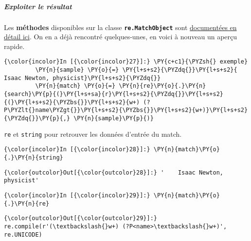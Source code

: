     \hypertarget{exploiter-le-ruxe9sultat}{%
\subparagraph{Exploiter le résultat}\label{exploiter-le-ruxe9sultat}}

    Les \textbf{méthodes} disponibles sur la classe
\textbf{\texttt{re.MatchObject}} sont
\href{https://docs.python.org/3/library/re.html\#match-objects}{documentées
en détail ici}. On en a déjà rencontré quelques-unes, en voici à nouveau
un aperçu rapide.

    \begin{Verbatim}[commandchars=\\\{\},frame=single,framerule=0.3mm,rulecolor=\color{cellframecolor}]
{\color{incolor}In [{\color{incolor}27}]:} \PY{c+c1}{\PYZsh{} exemple}
         \PY{n}{sample} \PY{o}{=} \PY{l+s+s2}{\PYZdq{}}\PY{l+s+s2}{    Isaac Newton, physicist}\PY{l+s+s2}{\PYZdq{}}
         \PY{n}{match} \PY{o}{=} \PY{n}{re}\PY{o}{.}\PY{n}{search}\PY{p}{(}\PY{l+s+sa}{r}\PY{l+s+s2}{\PYZdq{}}\PY{l+s+s2}{(}\PY{l+s+s2}{\PYZbs{}}\PY{l+s+s2}{w+) (?P\PYZlt{}name\PYZgt{}}\PY{l+s+s2}{\PYZbs{}}\PY{l+s+s2}{w+)}\PY{l+s+s2}{\PYZdq{}}\PY{p}{,} \PY{n}{sample}\PY{p}{)}
\end{Verbatim}


    \texttt{re} et \texttt{string} pour retrouver les données d'entrée du
match.

    \begin{Verbatim}[commandchars=\\\{\},frame=single,framerule=0.3mm,rulecolor=\color{cellframecolor}]
{\color{incolor}In [{\color{incolor}28}]:} \PY{n}{match}\PY{o}{.}\PY{n}{string}
\end{Verbatim}


\begin{Verbatim}[commandchars=\\\{\},frame=single,framerule=0.3mm,rulecolor=\color{cellframecolor}]
{\color{outcolor}Out[{\color{outcolor}28}]:} '    Isaac Newton, physicist'
\end{Verbatim}
            
    \begin{Verbatim}[commandchars=\\\{\},frame=single,framerule=0.3mm,rulecolor=\color{cellframecolor}]
{\color{incolor}In [{\color{incolor}29}]:} \PY{n}{match}\PY{o}{.}\PY{n}{re}
\end{Verbatim}


\begin{Verbatim}[commandchars=\\\{\},frame=single,framerule=0.3mm,rulecolor=\color{cellframecolor}]
{\color{outcolor}Out[{\color{outcolor}29}]:} re.compile(r'(\textbackslash{}w+) (?P<name>\textbackslash{}w+)', re.UNICODE)
\end{Verbatim}
            
